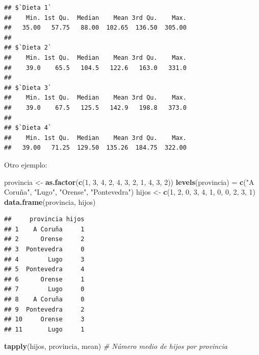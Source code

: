 \documentclass[
]{book}
\newenvironment{Shaded}{\begin{snugshade}}{\end{snugshade}}
\newcommand{\CommentTok}[1]{\textcolor[rgb]{0.56,0.35,0.01}{\textit{#1}}}
\newcommand{\DecValTok}[1]{\textcolor[rgb]{0.00,0.00,0.81}{#1}}
\newcommand{\FunctionTok}[1]{\textcolor[rgb]{0.13,0.29,0.53}{\textbf{#1}}}
\newcommand{\NormalTok}[1]{#1}
\newcommand{\OtherTok}[1]{\textcolor[rgb]{0.56,0.35,0.01}{#1}}
\newcommand{\StringTok}[1]{\textcolor[rgb]{0.31,0.60,0.02}{#1}}
\begin{document}
\begin{verbatim}
## $`Dieta 1`
##    Min. 1st Qu.  Median    Mean 3rd Qu.    Max. 
##   35.00   57.75   88.00  102.65  136.50  305.00 
## 
## $`Dieta 2`
##    Min. 1st Qu.  Median    Mean 3rd Qu.    Max. 
##    39.0    65.5   104.5   122.6   163.0   331.0 
## 
## $`Dieta 3`
##    Min. 1st Qu.  Median    Mean 3rd Qu.    Max. 
##    39.0    67.5   125.5   142.9   198.8   373.0 
## 
## $`Dieta 4`
##    Min. 1st Qu.  Median    Mean 3rd Qu.    Max. 
##   39.00   71.25  129.50  135.26  184.75  322.00
\end{verbatim}

Otro ejemplo:

\begin{Shaded}
\begin{Highlighting}[]
\NormalTok{provincia }\OtherTok{\textless{}{-}} \FunctionTok{as.factor}\NormalTok{(}\FunctionTok{c}\NormalTok{(}\DecValTok{1}\NormalTok{, }\DecValTok{3}\NormalTok{, }\DecValTok{4}\NormalTok{, }\DecValTok{2}\NormalTok{, }\DecValTok{4}\NormalTok{, }\DecValTok{3}\NormalTok{, }\DecValTok{2}\NormalTok{, }\DecValTok{1}\NormalTok{, }\DecValTok{4}\NormalTok{, }\DecValTok{3}\NormalTok{, }\DecValTok{2}\NormalTok{))}
\FunctionTok{levels}\NormalTok{(provincia) }\OtherTok{=} \FunctionTok{c}\NormalTok{(}\StringTok{"A Coruña"}\NormalTok{, }\StringTok{"Lugo"}\NormalTok{, }\StringTok{"Orense"}\NormalTok{, }\StringTok{"Pontevedra"}\NormalTok{)}
\NormalTok{hijos }\OtherTok{\textless{}{-}} \FunctionTok{c}\NormalTok{(}\DecValTok{1}\NormalTok{, }\DecValTok{2}\NormalTok{, }\DecValTok{0}\NormalTok{, }\DecValTok{3}\NormalTok{, }\DecValTok{4}\NormalTok{, }\DecValTok{1}\NormalTok{, }\DecValTok{0}\NormalTok{, }\DecValTok{0}\NormalTok{, }\DecValTok{2}\NormalTok{, }\DecValTok{3}\NormalTok{, }\DecValTok{1}\NormalTok{)}
\FunctionTok{data.frame}\NormalTok{(provincia, hijos)}
\end{Highlighting}
\end{Shaded}

\begin{verbatim}
##     provincia hijos
## 1    A Coruña     1
## 2      Orense     2
## 3  Pontevedra     0
## 4        Lugo     3
## 5  Pontevedra     4
## 6      Orense     1
## 7        Lugo     0
## 8    A Coruña     0
## 9  Pontevedra     2
## 10     Orense     3
## 11       Lugo     1
\end{verbatim}

\begin{Shaded}
\begin{Highlighting}[]
\FunctionTok{tapply}\NormalTok{(hijos, provincia, mean) }\CommentTok{\# Número medio de hijos por provincia}
\end{Highlighting}
\end{Shaded}
\end{document}
